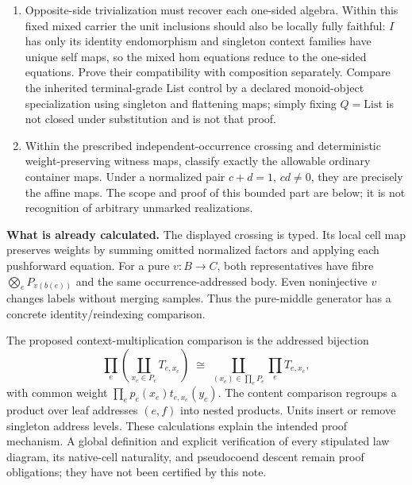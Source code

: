 \documentclass[11pt,a4paper]{article}
\newcommand{\status}[1]{\textbf{#1.}}
\begin{document}
\begin{enumerate}
$\varphi:R\to R'$, acting by $(X,p)\mapsto(X,\varphi p)$ and retaining
functions. Derive a pure-compatible strong comparison
$H_R\to H_{R'}$ with coherent identity and composite comparisons.
Finite sums and products commute with $\varphi$; no fullness or equivalence
is promised. The nonidentity map $\mathbb Q_{\ge0}\to\mathbb B$ taking
positive weights to true is the required substantive coefficient change,
from quantitative histories to possibilities, not a relabeling.
\item Opposite-side trivialization must recover each one-sided algebra.
Within this fixed mixed carrier the unit inclusions should also be locally
fully faithful: $I$ has only its identity endomorphism and singleton context
families have unique self maps, so the mixed hom equations reduce to the
one-sided equations. Prove their compatibility with composition separately.
Compare the inherited terminal-grade List control by a declared
monoid-object specialization using singleton and flattening maps; simply
fixing $Q=\mathrm{List}$ is not closed under substitution and is not that proof.
\item Within the prescribed independent-occurrence crossing and deterministic
weight-preserving witness maps, classify exactly the allowable ordinary
container maps. Under a normalized pair $c+d=1$, $cd\ne0$, they are
precisely the affine maps. The scope and proof of this bounded part are
below; it is not recognition of arbitrary unmarked realizations.
\end{enumerate}

\status{What is already calculated}
The displayed crossing is typed. Its local cell map preserves weights by
summing omitted normalized factors and applying each pushforward equation.
For a pure $v:B\to C$, both representatives have fibre
$\bigotimes_eP_{v(b(e))}$ and the same occurrence-addressed body.
Even noninjective $v$ changes labels without merging samples. Thus the
pure-middle generator has a concrete identity/reindexing comparison.

The proposed context-multiplication comparison is the addressed bijection
\[
 \prod_e\left(\coprod_{x_e\in P_e}T_{e,x_e}\right)
 \;\cong\;
 \coprod_{(x_e)\in\prod_eP_e}\prod_eT_{e,x_e},
\]
with common weight $\prod_e p_e(x_e)t_{e,x_e}(y_e)$. The content comparison
regroups a product over leaf addresses $(e,f)$ into nested products. Units
insert or remove singleton address levels. These calculations explain the
intended proof mechanism. A global definition and explicit verification of
every stipulated law diagram, its native-cell naturality, and pseudocoend
descent remain proof obligations; they have not been certified by this note.
\end{document}
